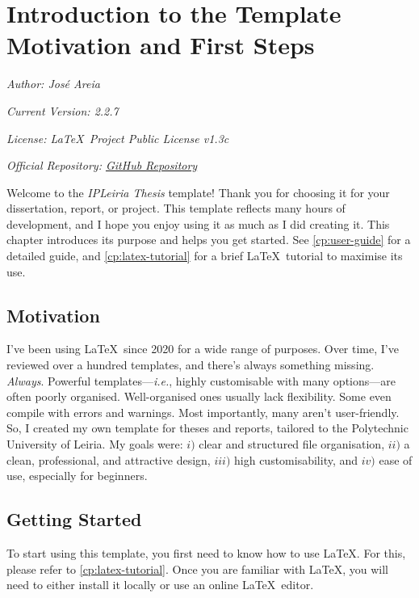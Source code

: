\chapter[Introduction to the Template: Motivation and First Steps]{Introduction to the Template Motivation and First Steps}
\label{cp:introduction}

{
\parindent0pt

\textit{Author: José Areia}

\textit{Current Version: 2.2.7}

\textit{License: \LaTeX~Project Public License v1.3c}

\textit{Official Repository: \href{https://github.com/joseareia/ipleiria-thesis}{GitHub Repository}}

\vspace{.935em}

Welcome to the \textcolor{maincolor}{\textit{IPLeiria Thesis}} template! Thank you for choosing it for your dissertation, report, or project. This template reflects many hours of development, and I hope you enjoy using it as much as I did creating it. This chapter introduces its purpose and helps you get started. See \autoref{cp:user-guide} for a detailed guide, and \autoref{cp:latex-tutorial} for a brief \LaTeX~tutorial to maximise its use.
}

\section{Motivation}
I've been using \LaTeX~since 2020 for a wide range of purposes. Over time, I've reviewed over a hundred templates, and there's always something missing. \textit{Always}. Powerful templates---\textit{i.e.}, highly customisable with many options---are often poorly organised. Well-organised ones usually lack flexibility. Some even compile with errors and warnings. Most importantly, many aren't user-friendly. So, I created my own template for theses and reports, tailored to the Polytechnic University of Leiria. My goals were: \(i)\) clear and structured file organisation, \(ii)\) a clean, professional, and attractive design, \(iii)\) high customisability, and \(iv)\) ease of use, especially for beginners.


\section{Getting Started}
To start using this template, you first need to know how to use \LaTeX. For this, please refer to \autoref{cp:latex-tutorial}. Once you are familiar with \LaTeX, you will need to either install it locally or use an online \LaTeX~editor.

